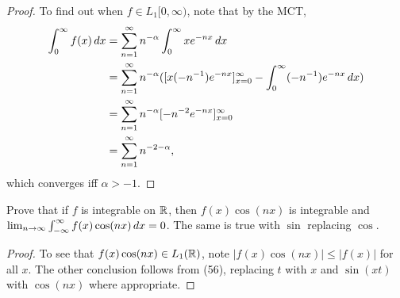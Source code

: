 \documentclass{article}
\begin{document}
\begin{proof}
To find out when $f \in L_1[0,\infty)$, note that by the MCT,
\begin{align*}
\int_0^\infty f(x) \,dx  &= \sum_{n=1}^\infty n^{-\alpha} \int_0^\infty x e^{-nx} \,dx 
\\ & = \sum_{n=1}^\infty n^{-\alpha} ( [x (-n^{-1}) e^{-nx}]_{x=0}^\infty - \int_0^\infty (-n^{-1}) e^{-nx} \,dx )
\\ & = \sum_{n=1}^\infty n^{-\alpha} [-n^{-2}e^{-nx}]_{x=0}^\infty
\\ & = \sum_{n=1}^\infty n^{-2-\alpha},
\end{align*}
which converges iff $\alpha > -1$.
\end{proof}

 Prove that if $f$ is integrable on $\mathbb{R}$, then $f(x) \cos(nx)$ is integrable and $\lim_{n\to\infty} \int_{-\infty}^\infty f(x) \cos(nx) \,dx = 0$. The same is true with $\sin$ replacing $\cos$.
\begin{proof}
To see that $f(x) \cos(nx) \in L_1(\mathbb{R})$, note $|f(x)\cos(nx)| \le |f(x)|$ for all $x$. The other conclusion follows from (56), replacing $t$ with $x$ and $\sin(xt)$ with $\cos(nx)$ where appropriate.
\end{proof}
\end{document}
